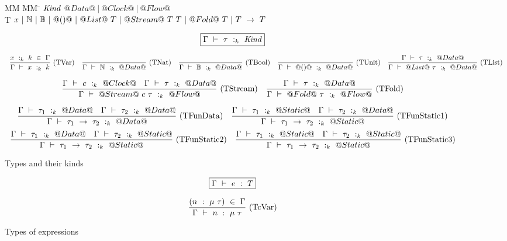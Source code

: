 
\begin{figure*}

\begin{tabbing}
MM \= MM \= \kill
$\mathit{Kind}$
\GrammarDef $@Data@~|~@Clock@~|~@Flow@$ \\

T
\GrammarDef $x~|~\mathbb{N}~|~\mathbb{B}~|~@()@
    ~|~ @List@~T
    ~|~ @Stream@~T~T
    ~|~ @Fold@~T
    ~|~ T~\to~T$ \\
\end{tabbing}

$$
\boxed{\Gamma~\vdash~\tau~:_k~\mathit{Kind}}
$$

$$
\enskip \frac {\displaystyle 
    x~:_k~k~\in~\Gamma
} {\displaystyle 
    \Gamma~\vdash~x~:_k~k
} \  \mbox{(TVar)} \enskip
\enskip \frac {\displaystyle } {\displaystyle 
    \Gamma~\vdash~\mathbb{N}~:_k~@Data@
} \  \mbox{(TNat)} \enskip
\enskip \frac {\displaystyle } {\displaystyle 
    \Gamma~\vdash~\mathbb{B}~:_k~@Data@
} \  \mbox{(TBool)} \enskip
\enskip \frac {\displaystyle } {\displaystyle 
    \Gamma~\vdash~@()@~:_k~@Data@
} \  \mbox{(TUnit)} \enskip
\enskip \frac {\displaystyle 
    \Gamma~\vdash~\tau~:_k~@Data@
} {\displaystyle 
    \Gamma~\vdash~@List@~\tau~:_k~@Data@
} \  \mbox{(TList)} \enskip
$$

$$
\enskip \frac {\displaystyle 
    \Gamma~\vdash~c~:_k~@Clock@
    \quad
    \Gamma~\vdash~\tau~:_k~@Data@
} {\displaystyle 
    \Gamma~\vdash~@Stream@~c~\tau~:_k~@Flow@
} \  \mbox{(TStream)} \enskip
\enskip \frac {\displaystyle 
    \Gamma~\vdash~\tau~:_k~@Data@
} {\displaystyle 
    \Gamma~\vdash~@Fold@~\tau~:_k~@Flow@
} \  \mbox{(TFold)} \enskip
$$

$$
\enskip \frac {\displaystyle 
    \Gamma~\vdash~\tau_1~:_k~@Data@
    \quad
    \Gamma~\vdash~\tau_2~:_k~@Data@
} {\displaystyle 
    \Gamma~\vdash~\tau_1~\to~\tau_2~:_k~@Data@
} \  \mbox{(TFunData)} \enskip
\enskip \frac {\displaystyle 
    \Gamma~\vdash~\tau_1~:_k~@Static@
    \quad
    \Gamma~\vdash~\tau_2~:_k~@Data@
} {\displaystyle 
    \Gamma~\vdash~\tau_1~\to~\tau_2~:_k~@Static@
} \  \mbox{(TFunStatic1)} \enskip
$$
$$
\enskip \frac {\displaystyle 
    \Gamma~\vdash~\tau_1~:_k~@Data@
    \quad
    \Gamma~\vdash~\tau_2~:_k~@Static@
} {\displaystyle 
    \Gamma~\vdash~\tau_1~\to~\tau_2~:_k~@Static@
} \  \mbox{(TFunStatic2)} \enskip
\enskip \frac {\displaystyle 
    \Gamma~\vdash~\tau_1~:_k~@Static@
    \quad
    \Gamma~\vdash~\tau_2~:_k~@Static@
} {\displaystyle 
    \Gamma~\vdash~\tau_1~\to~\tau_2~:_k~@Static@
} \  \mbox{(TFunStatic3)} \enskip
$$



\caption{Types and their kinds}
\label{fig:source:type:kinds}
\end{figure*}


\begin{figure*}

$$
\boxed{\Gamma ~\vdash~ e ~:~ T}
$$


$$
\frac {\displaystyle 
    (n~:~\mu~\tau)~\in~\Gamma
} {\displaystyle  
    \Gamma ~\vdash~ n ~:~ \mu~\tau
} \ 
\textrm{(TcVar)}
$$

\caption{Types of expressions}
\label{fig:source:type:exp}
\end{figure*}

